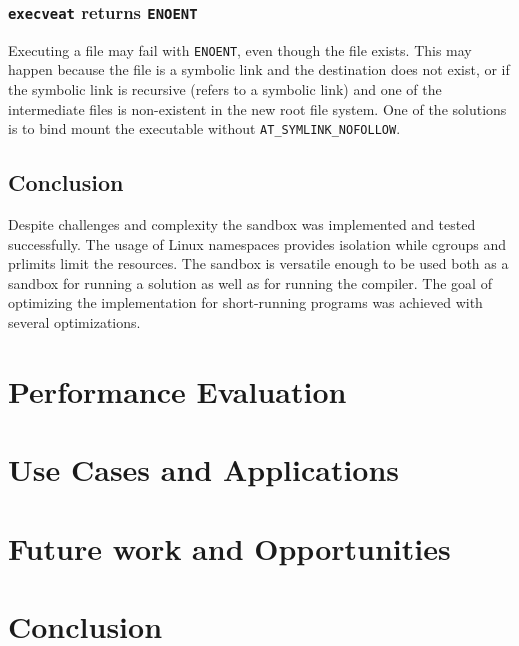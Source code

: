 \documentclass[en]{pracamgr}
\begin{document}
\subsection{\texttt{execveat} returns \texttt{ENOENT}} \label{execveat_returns_enoent}

Executing a file may fail with \texttt{ENOENT}, even though the file exists. This may happen because the file is a symbolic link and the destination does not exist, or if the symbolic link is recursive (refers to a symbolic link) and one of the intermediate files is non-existent in the new root file system. One of the solutions is to bind mount the executable without \texttt{AT\_SYMLINK\_NOFOLLOW}.

\section{Conclusion}

Despite challenges and complexity the sandbox was implemented and tested successfully. The usage of Linux namespaces provides isolation while cgroups and prlimits limit the resources. The sandbox is versatile enough to be used both as a sandbox for running a solution as well as for running the compiler. The goal of optimizing the implementation for short-running programs was achieved with several optimizations.

\chapter{Performance Evaluation}\label{chapter:performance}

\chapter{Use Cases and Applications}\label{chapter:use_cases}

\chapter{Future work and Opportunities}\label{chapter:future_work}



\chapter{Conclusion}\label{chapter:conclusion}
\end{document}
